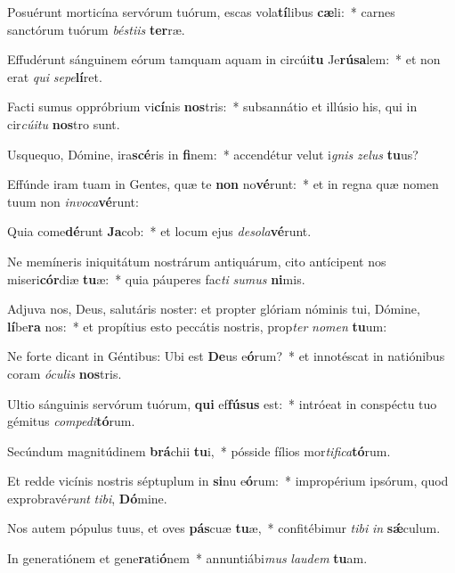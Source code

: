 \item Posuérunt morticína servórum tuórum, escas vola\textbf{tí}libus \textbf{cæ}li:~* carnes sanctórum tuórum \textit{bés}\textit{ti}\textit{is} \textbf{ter}ræ.
\item Effudérunt sánguinem eórum tamquam aquam in circúi\textbf{tu} Je\textbf{rú}\textbf{sa}lem:~* et non erat \textit{qui} \textit{se}\textit{pe}\textbf{lí}ret.
\item Facti sumus oppróbrium vi\textbf{cí}nis \textbf{nos}tris:~* subsannátio et illúsio his, qui in cir\textit{cú}\textit{i}\textit{tu} \textbf{nos}tro sunt.
\item Usquequo, Dómine, ira\textbf{scé}ris in \textbf{fi}nem:~* accendétur velut i\textit{gnis} \textit{ze}\textit{lus} \textbf{tu}us?
\item Effúnde iram tuam in Gentes, quæ te \textbf{non} no\textbf{vé}runt:~* et in regna quæ nomen tuum non \textit{in}\textit{vo}\textit{ca}\textbf{vé}runt:
\item Quia come\textbf{dé}runt \textbf{Ja}cob:~* et locum ejus \textit{de}\textit{so}\textit{la}\textbf{vé}runt.
\item Ne memíneris iniquitátum nostrárum antiquárum, cito antícipent nos miseri\textbf{cór}diæ \textbf{tu}æ:~* quia páuperes fac\textit{ti} \textit{su}\textit{mus} \textbf{ni}mis.
\item Adjuva nos, Deus, salutáris noster: et propter glóriam nóminis tui, Dómine, \textbf{lí}be\textbf{ra} nos:~* et propítius esto peccátis nostris, prop\textit{ter} \textit{no}\textit{men} \textbf{tu}um:
\item Ne forte dicant in Géntibus: Ubi est \textbf{De}us e\textbf{ó}rum?~* et innotéscat in natiónibus coram \textit{ó}\textit{cu}\textit{lis} \textbf{nos}tris.
\item Ultio sánguinis servórum tuórum, \textbf{qui} ef\textbf{fú}\textbf{sus} est:~* intróeat in conspéctu tuo gémitus \textit{com}\textit{pe}\textit{di}\textbf{tó}rum.
\item Secúndum magnitúdinem \textbf{brá}chii \textbf{tu}i,~* pósside fílios mor\textit{ti}\textit{fi}\textit{ca}\textbf{tó}rum.
\item Et redde vicínis nostris séptuplum in \textbf{si}nu e\textbf{ó}rum:~* impropérium ipsórum, quod exprobravé\textit{runt} \textit{ti}\textit{bi}, \textbf{Dó}mine.
\item Nos autem pópulus tuus, et oves \textbf{pás}cuæ \textbf{tu}æ,~* confitébimur \textit{ti}\textit{bi} \textit{in} \textbf{sǽ}culum.
\item In generatiónem et gene\textbf{ra}ti\textbf{ó}nem~* annuntiábi\textit{mus} \textit{lau}\textit{dem} \textbf{tu}am.
